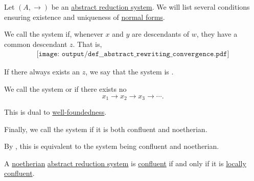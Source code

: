 \begin{definition}\label{def:abstract_rewriting_convergence}
  Let \( (A, \to) \) be an \hyperref[def:abstract_reduction_system]{abstract reduction system}. We will list several conditions ensuring existence and uniqueness of \hyperref[def:abstract_rewriting_system/normal_form]{normal forms}.

  \begin{thmenum}
     We call the system  if, whenever \( x \) and \( y \) are descendants of \( w \), they have a common descendant \( z \). That is,
    \begin{equation}\label{eq:def:abstract_rewriting_convergence/confluence/diagram}
      \begin{aligned}
        \texttt{[image: output/def\_\_abstract\_rewriting\_convergence.pdf]}
      \end{aligned}
    \end{equation}

    If there always exists an  \( z \), we say that the system is .

     We call the system  or  if there exists no 
    \begin{equation*}
      x_1 \to x_2 \to x_3 \to \cdots.
    \end{equation*}

    This is dual to \hyperref[def:well_founded_relation]{well-foundedness}.

     Finally, we call the system  if it is both confluent and noetherian.

    By , this is equivalent to the system being  confluent and noetherian.
  \end{thmenum}
\end{definition}

\begin{proposition}\label{thm:noetherian_rewriting_system_local_confluence}
  A \hyperref[def:abstract_rewriting_convergence/noetherian]{noetherian}  \hyperref[def:abstract_reduction_system]{abstract reduction system} is \hyperref[def:abstract_rewriting_convergence/confluence]{confluent} if and only if it is \hyperref[def:abstract_rewriting_convergence/confluence]{locally confluent}.
\end{proposition}

